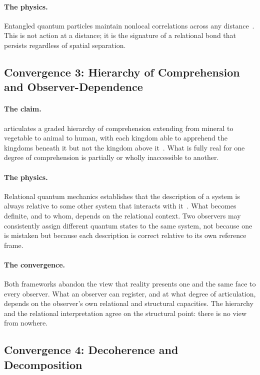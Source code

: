 \paragraph{The physics.}
Entangled quantum particles maintain nonlocal correlations across any distance~\citep{Aspect1982,Zeilinger2023Nobel}.
This is not action at a distance; it is the signature of a relational bond
that persists regardless of spatial separation.

\subsection{Convergence 3: Hierarchy of Comprehension and Observer-Dependence}

\paragraph{The \bahai claim.}
\AbdulBaha articulates a graded hierarchy of comprehension extending from
mineral to vegetable to animal to human, with each kingdom able to
apprehend the kingdoms beneath it but not the kingdom above it~\citep[Part 4]{SAQ}.
What is fully real for one degree of comprehension is partially or wholly
inaccessible to another.

\paragraph{The physics.}
Relational quantum mechanics establishes that the description of a system is
always relative to some other system that interacts with it~\citep{Rovelli1996}.
What becomes definite, and to whom, depends on the relational context.
Two observers may consistently assign different quantum states to the same
system, not because one is mistaken but because each description is correct
relative to its own reference frame.

\paragraph{The convergence.}
Both frameworks abandon the view that reality presents one and the same face
to every observer.
What an observer can register, and at what degree of articulation, depends on
the observer's own relational and structural capacities.
The \bahai hierarchy and the relational interpretation agree on the structural
point: there is no view from nowhere.

\subsection{Convergence 4: Decoherence and Decomposition}


